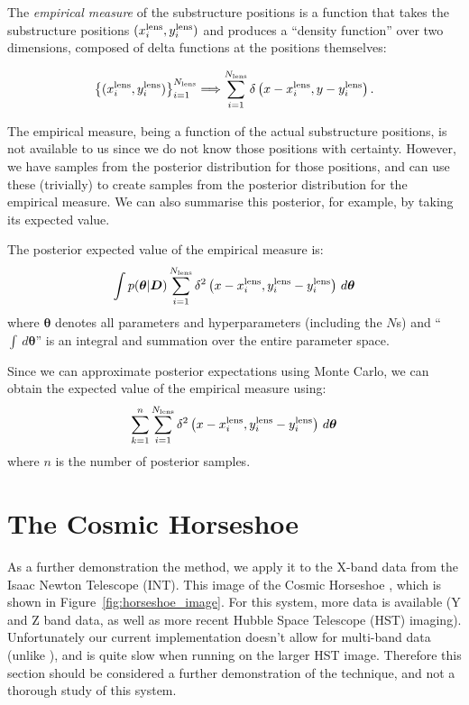 \documentclass[useAMS,usenatbib]{mn2e}
\begin{document}
The {\it empirical measure} of the substructure positions is a function that
takes the substructure positions $(x_i^{\rm lens}, y_i^{\rm lens})$ and
produces a ``density function'' over two dimensions, composed of delta
functions at the positions themselves:

\begin{eqnarray}
\left\{
(x_i^{\rm lens}, y_i^{\rm lens})
\right\}_{i=1}^{N_{\rm lens}}
\Longrightarrow
\sum_{i=1}^{N_{\rm lens}}
\delta\left(x - x_i^{\rm lens}, y - y_i^{\rm lens}\right).
\end{eqnarray}

The empirical measure, being a function of the actual substructure positions,
is not available to us since we do not know those positions with certainty.
However, we have samples from the posterior distribution for those positions,
and can use these (trivially) to create samples from the posterior distribution
for the empirical measure. We can also summarise this posterior, for example,
by taking its expected value.

The posterior expected value of the empirical measure is:
\begin{eqnarray}
\int p(\boldsymbol{\theta} | \boldsymbol{D})
\sum_{i=1}^{N_{\rm lens}}
\delta^2\left(x - x_i^{\rm lens}, y_i^{\rm lens} - y_i^{\rm lens}\right)
\, d\boldsymbol{\theta}
\end{eqnarray}
where $\boldsymbol{\theta}$ denotes all parameters and hyperparameters
(including the $N$s) and ``$\int \,d\boldsymbol{\theta}$'' is an integral and summation over the entire parameter space.

Since we can approximate posterior expectations using Monte Carlo, we can
obtain the expected value of the empirical measure using:
\begin{eqnarray}
\sum_{k=1}^n
\sum_{i=1}^{N_{\rm lens}}
\delta^2\left(x - x_i^{\rm lens}, y_i^{\rm lens} - y_i^{\rm lens}\right)
\, d\boldsymbol{\theta}
\end{eqnarray}
where $n$ is the number of posterior samples.


\section{The Cosmic Horseshoe}
As a further demonstration the method, we apply it to the X-band data
from the Isaac Newton Telescope (INT). This image of the Cosmic Horseshoe
\citep{}, which is shown in Figure~\ref{fig:horseshoe_image}. For this system,
more data is available (Y and Z band data, as well as more recent
Hubble Space Telescope (HST) imaging). Unfortunately our current implementation
doesn't allow for multi-band data (unlike \citet{2011MNRAS.412.2521B}), and
is quite slow when running on the larger HST image. Therefore this section
should be considered a further demonstration of the technique, and not a
thorough study of this system.
\end{document}
